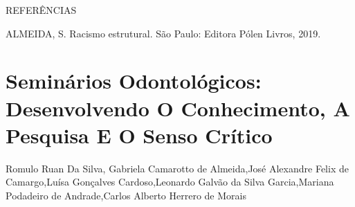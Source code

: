 REFERÊNCIAS

ALMEIDA, S. Racismo estrutural. São Paulo: Editora Pólen Livros, 2019.




\section*{Seminários Odontológicos: Desenvolvendo O Conhecimento, A Pesquisa E O Senso Crítico}

Romulo Ruan Da Silva, Gabriela Camarotto de Almeida,José Alexandre Felix de Camargo,Luísa Gonçalves Cardoso,Leonardo Galvão da Silva Garcia,Mariana Podadeiro de Andrade,Carlos Alberto Herrero de Morais

